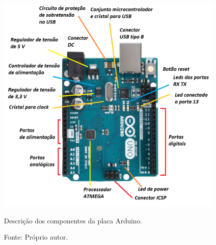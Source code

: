 \begin{figure}[H]
\centering
\includegraphics[width = 1\linewidth]{figuras/placaarduino}
\caption{Descrição dos componentes da placa Arduino.}
\caption*{Fonte: Próprio autor.}
\label{fig:placaarduino}
\end{figure}
    
